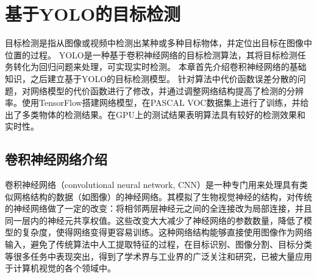 
\chapter{基于YOLO的目标检测}
目标检测是指从图像或视频中检测出某种或多种目标物体，并定位出目标在图像中位置的过程。
YOLO是一种基于卷积神经网络的目标检测算法，其将目标检测任务转化为回归问题来处理，可实现实时检测。
本章首先介绍卷积神经网络的基础知识，之后建立基于YOLO的目标检测模型。
针对算法中代价函数误差分散的问题，对网络模型的代价函数进行了修改，并通过调整网络结构提高了检测的分辨率。使用TensorFlow搭建网络模型，在PASCAL VOC数据集上进行了训练，并给出了多类物体的检测结果。在GPU上的测试结果表明算法具有较好的检测效果和实时性。


\section{卷积神经网络介绍}
卷积神经网络（convolutional neural network, CNN）\cite{lecun1989}是一种专门用来处理具有类似网格结构的数据（如图像）的神经网络\cite{Goodfellow-et-al-2016}。其模拟了生物视觉神经的结构，对传统的神经网络做了一定的改变：将相邻两层神经元之间的全连接改为局部连接，并且同一层内的神经元共享权值。这些改变大大减少了神经网络的参数数量，降低了模型的复杂度，使得网络变得更容易训练。这种网络结构能够直接使用图像作为网络输入，避免了传统算法中人工提取特征的过程，在目标识别、图像分割、目标分类等很多任务中表现突出，得到了学术界与工业界的广泛关注和研究，已被大量应用于计算机视觉的各个领域中。




